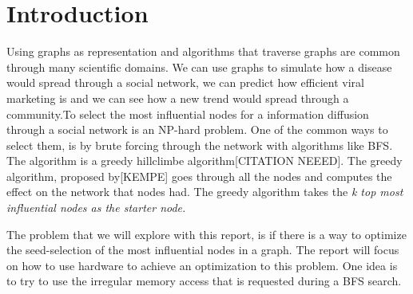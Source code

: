 \chapter{Introduction} 
Using graphs as representation and algorithms that traverse graphs are common through many scientific domains\cite{HybridBFS2015}. We can use graphs to simulate how a disease would spread through a social network, we can predict how efficient viral marketing is and we can see how a new trend would spread through a community\cite{MaximizeSpread2003}.To select the most influential nodes for a information diffusion through a social network is an NP-hard problem\cite{MaximizeSpread2003}. One of the common ways to select them, is by brute forcing through the network with algorithms like BFS. The algorithm is a greedy hillclimbe algorithm[CITATION NEEED]. The greedy algorithm, proposed by[KEMPE] goes through all the nodes and computes the effect on the network that nodes had. The greedy algorithm takes the \it{k} top most influential nodes as the starter node. 

The problem that we will explore with this report, is if there is a way to optimize the seed-selection of the most influential nodes in a graph. The report will focus on how to use hardware to achieve an optimization to this problem. One idea is to try to use the irregular memory access that is requested during a BFS search. 

